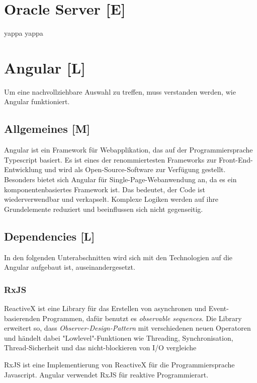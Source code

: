 \section{Oracle Server [E]}
yappa yappa

\section{Angular [L]}
Um eine nachvollziehbare Auswahl zu treffen, muss verstanden werden, wie Angular funktioniert. 

\subsection{Allgemeines [M]}
Angular ist ein Framework für Webapplikation, das auf der Programmiersprache Typescript basiert. Es ist eines der renommiertesten Frameworks zur Front-End-Entwicklung und wird als Open-Source-Software zur Verfügung gestellt. Besonders bietet sich Angular für Single-Page-Webanwendung an, da es ein komponentenbasiertes Framework ist. Das bedeutet, der Code ist wiederverwendbar und verkapselt. Komplexe Logiken werden auf ihre Grundelemente reduziert und beeinflussen sich nicht gegenseitig. 
\cite{AngularGeneral}

\subsection{Dependencies [L]}
In den folgenden Unterabschnitten wird sich mit den Technologien auf die Angular aufgebaut ist, auseinandergesetzt. 
\subsubsection{RxJS}
ReactiveX ist eine Library für das Erstellen von asynchronen und Event-basierenden Programmen, dafür benutzt es  \emph{observable sequences}.
Die Library erweitert so, dass \emph{Observer-Design-Pattern} mit verschiedenen neuen Operatoren und händelt dabei "Lowlevel"-Funktionen wie Threading, Synchronisation, Thread-Sicherheit und das nicht-blockieren von I/O vergleiche \cite{ReactiveXIntro}

RxJS ist eine Implementierung von ReactiveX für die Programmiersprache Javascript. Angular verwendet RxJS für reaktive Programmierart.
